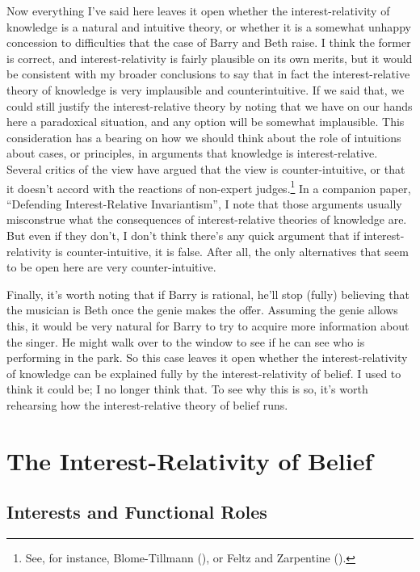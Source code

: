 \documentclass[
  11pt,
  letterpaper,
  DIV=11,
  numbers=noendperiod,
  twoside]{scrartcl}
\begin{document}
Now everything I've said here leaves it open whether the
interest-relativity of knowledge is a natural and intuitive theory, or
whether it is a somewhat unhappy concession to difficulties that the
case of Barry and Beth raise. I think the former is correct, and
interest-relativity is fairly plausible on its own merits, but it would
be consistent with my broader conclusions to say that in fact the
interest-relative theory of knowledge is very implausible and
counterintuitive. If we said that, we could still justify the
interest-relative theory by noting that we have on our hands here a
paradoxical situation, and any option will be somewhat implausible. This
consideration has a bearing on how we should think about the role of
intuitions about cases, or principles, in arguments that knowledge is
interest-relative. Several critics of the view have argued that the view
is counter-intuitive, or that it doesn't accord with the reactions of
non-expert judges.\footnote{See, for instance, Blome-Tillmann
  (), or Feltz and Zarpentine
  ().} In a companion paper,
``Defending Interest-Relative Invariantism'', I note that those
arguments usually misconstrue what the consequences of interest-relative
theories of knowledge are. But even if they don't, I don't think there's
any quick argument that if interest-relativity is counter-intuitive, it
is false. After all, the only alternatives that seem to be open here are
very counter-intuitive.

Finally, it's worth noting that if Barry is rational, he'll stop (fully)
believing that the musician is Beth once the genie makes the offer.
Assuming the genie allows this, it would be very natural for Barry to
try to acquire more information about the singer. He might walk over to
the window to see if he can see who is performing in the park. So this
case leaves it open whether the interest-relativity of knowledge can be
explained fully by the interest-relativity of belief. I used to think it
could be; I no longer think that. To see why this is so, it's worth
rehearsing how the interest-relative theory of belief runs.

\section{The Interest-Relativity of Belief}\label{sec-2}

\subsection{Interests and Functional
Roles}\label{interests-and-functional-roles}
\end{document}

